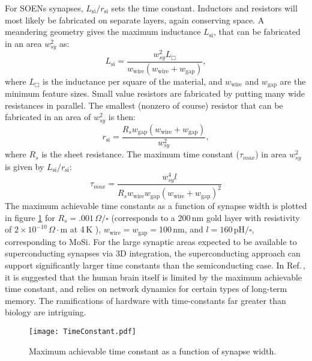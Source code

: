 \documentclass[twocolumn]{article}
\begin{document}
For SOENs synapses, $L_{\mathrm{si}}/r_{\mathrm{si}}$ sets the time constant. Inductors and resistors will most likely be fabricated on separate layers, again conserving space. A meandering geometry gives the maximum inductance $L_{\mathrm{si}}$, that can be fabricated in an area $w_{sy}^2$ as:
\begin{equation}
    L_{\mathrm{si}} = \frac{w_{sy}^2L_{\Box}}{w_{\mathrm{wire}}(w_{\mathrm{wire}} + w_{\mathrm{gap}})},
\end{equation}
where $L_{\Box}$ is the inductance per square of the material, and $w_{\mathrm{wire}}$ and $w_{\mathrm{gap}}$ are the minimum feature sizes. Small value resistors are fabricated by putting many wide resistances in parallel. The smallest (nonzero of course) resistor that can be fabricated in an area of $w_{sy}^2$ is then:
\begin{equation}
    r_{\mathrm{si}} = \frac{R_sw_{\mathrm{gap}}(w_{\mathrm{wire}} + w_{\mathrm{gap}})}{w_{sy}^2},
\end{equation}
where $R_s$ is the sheet resistance. The maximum time constant ($\tau_{max}$) in area $w_{sy}^2$ is given by $L_{\mathrm{si}}/r_{\mathrm{si}}$:
\begin{equation}
    \tau_{max} = \frac{w_{sy}^4l}{R_sw_{\mathrm{wire}}w_{\mathrm{gap}}(w_{\mathrm{wire}}+w_{\mathrm{gap}})^2}
\end{equation}
The maximum achievable time constants as a function of synapse width is plotted in figure \ref{fig:timecon} for $R_s = .001$\,$\Omega/\square$ (corresponds to a 200\,nm gold layer with resistivity of $2\times 10^{-10}\,\Omega\cdot$m at 4\,K \cite{matula1979electrical}), $w_{\mathrm{wire}} = w_{\mathrm{gap}} = $100\,nm, and $l = 160$\,pH$/\square$, corresponding to MoSi. For the large synaptic areas expected to be available to superconducting synapses via 3D integration, the superconducting approach can support significantly larger time constants than the semiconducting case. In Ref.\,\cite{indiveri2019importance}, it is suggested that the human brain itself is limited by the maximum achievable time constant, and relies on network dynamics for certain types of long-term memory. The ramifications of hardware with time-constants far greater than biology are intriguing. 
\begin{figure}[!h]
    \centering
    \texttt{[image: TimeConstant.pdf]}
    \caption{Maximum achievable time constant as a function of synapse width.}
    \label{fig:timecon}
\end{figure}
\end{document}
